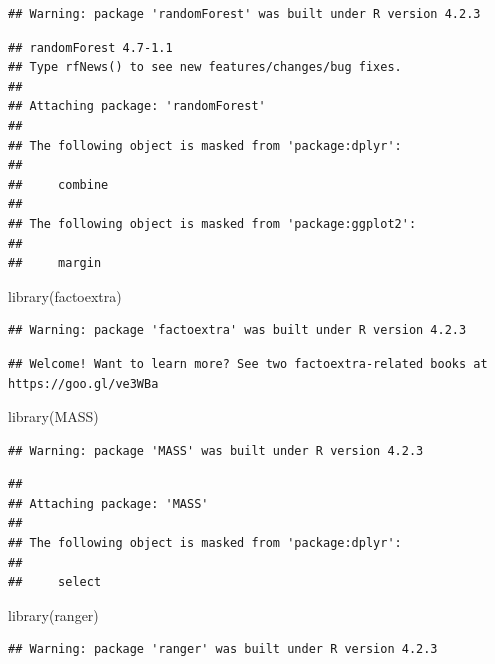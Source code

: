 \documentclass[
]{article}
\newenvironment{Shaded}{\begin{snugshade}}{\end{snugshade}}
\newcommand{\FunctionTok}[1]{\textcolor[rgb]{0.00,0.00,0.00}{#1}}
\newcommand{\NormalTok}[1]{#1}
\begin{document}
\begin{verbatim}
## Warning: package 'randomForest' was built under R version 4.2.3
\end{verbatim}

\begin{verbatim}
## randomForest 4.7-1.1
## Type rfNews() to see new features/changes/bug fixes.
## 
## Attaching package: 'randomForest'
## 
## The following object is masked from 'package:dplyr':
## 
##     combine
## 
## The following object is masked from 'package:ggplot2':
## 
##     margin
\end{verbatim}

\begin{Shaded}
\begin{Highlighting}[]
\FunctionTok{library}\NormalTok{(factoextra)}
\end{Highlighting}
\end{Shaded}

\begin{verbatim}
## Warning: package 'factoextra' was built under R version 4.2.3
\end{verbatim}

\begin{verbatim}
## Welcome! Want to learn more? See two factoextra-related books at https://goo.gl/ve3WBa
\end{verbatim}

\begin{Shaded}
\begin{Highlighting}[]
\FunctionTok{library}\NormalTok{(MASS)}
\end{Highlighting}
\end{Shaded}

\begin{verbatim}
## Warning: package 'MASS' was built under R version 4.2.3
\end{verbatim}

\begin{verbatim}
## 
## Attaching package: 'MASS'
## 
## The following object is masked from 'package:dplyr':
## 
##     select
\end{verbatim}

\begin{Shaded}
\begin{Highlighting}[]
\FunctionTok{library}\NormalTok{(ranger)}
\end{Highlighting}
\end{Shaded}

\begin{verbatim}
## Warning: package 'ranger' was built under R version 4.2.3
\end{verbatim}
\end{document}

